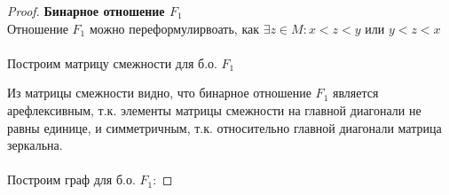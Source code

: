 \pagebreak
\begin{proof} \textbf{Бинарное отношение $F_1$}\\
Отношение $F_1$ можно переформулирвоать, как $\exists z \in M: x < z < y \text{ или } y < z < x$
\\ \\
Построим матрицу смежности для б.о. $F_1$
\begin{center}
\end{center}
Из матрицы смежности видно, что бинарное отношение $F_1$ является арефлексивным, т.к. элементы матрицы смежности на главной диагонали не равны единице, и симметричным, т.к. относительно главной диагонали матрица зеркальна.
\\ \\
Построим граф для б.о. $F_1$:


\end{proof}
